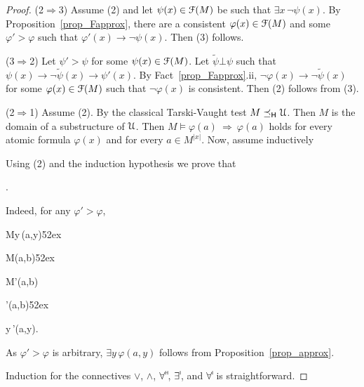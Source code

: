 \documentclass[10pt,oneside]{amsproc}
\begin{document}
{\begin{proof}
  (2$\Rightarrow$3)
  Assume (2) and let $\psi(x)\in{\EuScript F}(M)$ be such that $\exists x\,\neg\psi(x)$.
  By Proposition~\ref{prop_Fapprox}, there are a consistent $\varphi(x)\in{\EuScript F}(M)$ and some $\varphi'>\varphi$ such that $\varphi'(x)\rightarrow\neg\psi(x)$.
  Then (3) follows.

  (3$\Rightarrow$2)
  Let $\psi'>\psi$ for some $\psi(x)\in{\EuScript F}(M)$.
  Let $\tilde{\psi}\bot\psi$ such that $\psi(x)\rightarrow\neg\tilde{\psi}(x)\rightarrow\psi'(x)$.
  By Fact~\ref{prop_Fapprox}.ii, $\neg\varphi(x)\rightarrow\neg\tilde{\psi}(x)$ for some $\varphi(x)\in{\EuScript F}(M)$ such that $\neg\varphi(x)$ is consistent.
  Then (2) follows from (3).
  
  (2$\Rightarrow$1)
  Assume (2).
  By the classical Tarski-Vaught test $M\preceq_{\sf H}{\EuScript U}$.
  Then $M$ is the domain of a substructure of ${\EuScript U}$.
  Then $M\models\varphi(a)\ \Rightarrow\ \varphi(a)$ holds for every atomic formula $\varphi(x)$ and for every $a\in M^{|x|}$.
  Now, assume inductively
  

  Using (2) and the induction hypothesis we prove that

  .

  Indeed, for any $\varphi'>\varphi$,

  {\Rightarrow}{M\models\exists y\,\psi(a,y)}\hfill{}\kern52ex%
  
  \ceq{}
  {\Rightarrow}
  {M\models\psi(a,b)}\hfill{}\kern52ex
  
  \ceq{}
  {\Rightarrow}
  {M\models\varphi'(a,b)}
  
  \ceq{}
  {\Rightarrow}
  {\varphi'(a,b)}\hfill{}\kern52ex

  \ceq{}
  {\Rightarrow}
  {\exists y\,\varphi'(a,y).}

  As $\varphi'>\varphi$ is arbitrary, $\exists y\,\varphi(a,y)$ follows from Proposition~\ref{prop_approx}.

  Induction for the connectives $\vee$, $\wedge$, $\forall\raisebox{1.1ex}{\scaleto{\sf H}{.8ex}\kern-.2ex}$, $\exists\raisebox{1.1ex}{\scaleto{\sf I}{.8ex}\kern-.2ex}$, and $\forall\raisebox{1.1ex}{\scaleto{\sf I}{.8ex}\kern-.2ex}$ is straightforward.


\end{proof}}
\end{document}
